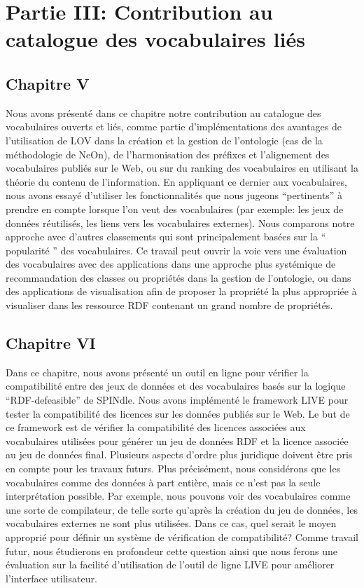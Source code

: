\documentclass[a4paper,11pt,twoside]{report}
\begin{document}
\chapter*{Partie III: Contribution au catalogue des vocabulaires liés}

\section*{Chapitre V}


Nous avons présenté dans ce chapitre notre contribution au catalogue des vocabulaires ouverts et liés, comme partie d'implémentations des avantages de l'utilisation de LOV dans la création et la gestion de l'ontologie (cas de la méthodologie de NeOn), de l'harmonisation des préfixes et l'alignement des vocabulaires publiés sur le Web, ou sur du ranking des vocabulaires en utilisant la théorie du contenu de l'information. En appliquant ce dernier aux vocabulaires, nous avons essayé d'utiliser les fonctionnalités que nous jugeons ``pertinents''  à prendre en compte lorsque l'on veut des vocabulaires (par exemple: les jeux de données réutilisés, les liens vers les vocabulaires externes). Nous comparons notre approche avec d'autres classements qui sont principalement basées sur la `` popularité '' des vocabulaires. Ce travail peut ouvrir la voie vers une évaluation des vocabulaires avec des applications dans une approche plus systémique de recommandation des classes ou propriétés dans la gestion de l'ontologie, ou dans des applications de visualisation afin de proposer la  propriété la plus appropriée à visualiser dans les ressource RDF contenant un grand nombre de propriétés.

\section*{Chapitre VI}


Dans ce chapitre, nous avons présenté un outil en ligne pour vérifier la compatibilité entre des jeux de données et des vocabulaires basés sur la logique ``RDF-defeasible'' de SPINdle. Nous avons implémenté le framework LIVE pour tester la compatibilité des licences sur les données publiés sur le Web. Le but de ce framework est de vérifier la compatibilité des licences associées aux vocabulaires utilisées pour générer un jeu de données RDF et la licence associée au jeu de données final. Plusieurs aspects d'ordre plus juridique doivent être pris en compte pour les travaux futurs.
Plus précisément, nous considérons que les vocabulaires comme des données à part entière, mais ce n'est pas la seule interprétation possible. Par exemple, nous pouvons voir des vocabulaires comme une sorte de compilateur, de telle sorte qu'après la création du jeu de données, les vocabulaires externes ne sont plus utilisées. Dans ce cas, quel serait le moyen approprié pour définir un système de vérification de compatibilité? Comme travail futur, nous étudierons en profondeur cette question ainsi que nous ferons une évaluation sur la facilité d'utilisation de l'outil de ligne LIVE pour améliorer l'interface utilisateur.
\end{document}
